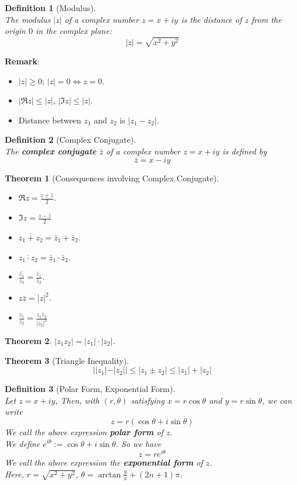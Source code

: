 \documentclass[12pt]{article}
\newtheorem{definition}{Definition}[section]
\newtheorem{theorem}{Theorem}[section]
\theoremstyle{definition}
\begin{document}
\begin{definition}[Modulus]
\hfill\\\normalfont The modulus $|z|$ of a complex number $z=x+iy$ is the distance of $z$ from the origin $0$ in the complex plane:
\[
|z|=\sqrt{x^2 + y^2}
\]
\end{definition}
\textbf{Remark}:
\begin{itemize}
	\item $|z|\geq 0$; $|z|=0\Leftrightarrow z=0$.
	\item $|\Re z|\leq |z|$, $|\Im z|\leq |z|$.
	\item Distance between $z_1$ and $z_2$ is $|z_1-z_2|$.
\end{itemize}
\begin{definition}[Complex Conjugate]
\hfill\\\normalfont The \textbf{complex conjugate} $\bar{z}$ of a complex number $z=x+iy$ is defined by
\[
\bar{z}=x-iy
\]
\end{definition}
\begin{theorem}[Consequences involving Complex Conjugate]
\hfill\\\normalfont 
\begin{itemize}
	\item $\Re z= \frac{z+\bar{z}}{2}$.
	\item $\Im z=\frac{z-\bar{z}}{2}$
	\item $\overline{z_1 + z_2} = \bar{z}_1 + \bar{z}_2$.
	\item $\overline{z_1\cdot z_2} = \bar{z}_1 \cdot \bar{z}_2$.
	\item $\overline{\frac{z_1}{z_2}}=\frac{\bar{z}_1}{\bar{z}_2}$.
	\item $z\bar{z}=|z|^2$.
	\item $\frac{z_1}{z_2}=\frac{z_1\bar{z}_2}{|z_2|^2}$
\end{itemize}
\end{theorem}
\begin{theorem}$|z_1z_2|=|z_1|\cdot |z_2|$.\end{theorem}
\begin{theorem}[Triangle Inequality]
\[||z_1|-|z_2||\leq |z_1\pm z_2|\leq |z_1|+|z_2|\]
\end{theorem}
\begin{definition}[Polar Form, Exponential Form]
\hfill\\\normalfont Let $z=x+iy$, Then, with $(r, \theta)$ satisfying $x=r\cos\theta$ and $y=r\sin\theta$, we can write
\[
z=r(\cos\theta + i\sin\theta)
\]
We call the above expression \textbf{polar form} of $z$.\\
We define $e^{i\theta}:=\cos\theta + i\sin\theta$. So we have
\[
z=re^{i\theta}
\]
We call the above expression the \textbf{exponential form} of $z$.\\
Here, $r=\sqrt{x^2 + y^2}$, $\theta = \arctan \frac{y}{x} + (2n+1)\pi$.
\end{definition}
\end{document}
